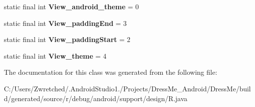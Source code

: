 \begin{DoxyCompactItemize}
\item 
\hypertarget{classandroid_1_1support_1_1design_1_1_r_1_1styleable_a3d64256b1ef377ea472c9b16e3d9ca72}{}static final int {\bfseries View\+\_\+android\+\_\+theme} = 0\label{classandroid_1_1support_1_1design_1_1_r_1_1styleable_a3d64256b1ef377ea472c9b16e3d9ca72}

\item 
\hypertarget{classandroid_1_1support_1_1design_1_1_r_1_1styleable_a39d2f956f97b594db965bf5bf2ab140c}{}static final int {\bfseries View\+\_\+padding\+End} = 3\label{classandroid_1_1support_1_1design_1_1_r_1_1styleable_a39d2f956f97b594db965bf5bf2ab140c}

\item 
\hypertarget{classandroid_1_1support_1_1design_1_1_r_1_1styleable_a32303521941b6c1b55688083d340802d}{}static final int {\bfseries View\+\_\+padding\+Start} = 2\label{classandroid_1_1support_1_1design_1_1_r_1_1styleable_a32303521941b6c1b55688083d340802d}

\item 
\hypertarget{classandroid_1_1support_1_1design_1_1_r_1_1styleable_a354c42dd69296d28a7ecf2124e7b062d}{}static final int {\bfseries View\+\_\+theme} = 4\label{classandroid_1_1support_1_1design_1_1_r_1_1styleable_a354c42dd69296d28a7ecf2124e7b062d}

\end{DoxyCompactItemize}


The documentation for this class was generated from the following file\+:\begin{DoxyCompactItemize}
\item 
C\+:/\+Users/\+Zwretched/.\+Android\+Studio1./\+Projects/\+Dress\+Me\+\_\+\+Android/\+Dress\+Me/build/generated/source/r/debug/android/support/design/R.\+java\end{DoxyCompactItemize}
